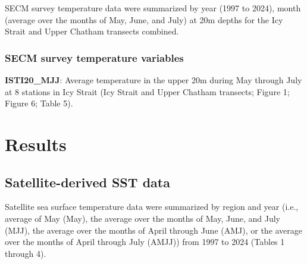 \documentclass[
]{article}
\begin{document}
SECM survey temperature data were summarized by year (1997 to 2024),
month (average over the months of May, June, and July) at 20m depths for
the Icy Strait and Upper Chatham transects combined.

\subsubsection{SECM survey temperature
variables}\label{secm-survey-temperature-variables}

\textbf{ISTI20\_MJJ}: Average temperature in the upper 20m during May
through July at 8 stations in Icy Strait (Icy Strait and Upper Chatham
transects; Figure 1; Figure 6; Table 5).

\section{Results}\label{results}

\subsection{Satellite-derived SST
data}\label{satellite-derived-sst-data-1}

Satellite sea surface temperature data were summarized by region and
year (i.e., average of May (May), the average over the months of May,
June, and July (MJJ), the average over the months of April through June
(AMJ), or the average over the months of April through July (AMJJ)) from
1997 to 2024 (Tables 1 through 4).

\pagebreak
\end{document}

